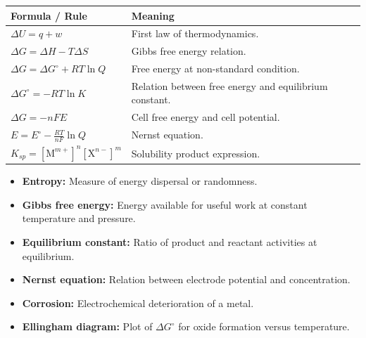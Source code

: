 \documentclass[12pt,a4paper]{article}
\begin{document}
\begin{tcolorbox}[formulabox, title={Key Formulas at a Glance}]
\begin{tabularx}{\linewidth}{|B{4.0cm}|Y|}
\hline
\textbf{Formula / Rule} & \textbf{Meaning} \\
\hline
$\Delta U=q+w$ & First law of thermodynamics. \\
\hline
$\Delta G=\Delta H-T\Delta S$ & Gibbs free energy relation. \\
\hline
$\Delta G=\Delta G^\circ+RT\ln Q$ & Free energy at non-standard condition. \\
\hline
$\Delta G^\circ=-RT\ln K$ & Relation between free energy and equilibrium constant. \\
\hline
$\Delta G=-nFE$ & Cell free energy and cell potential. \\
\hline
$E=E^\circ-\displaystyle\frac{RT}{nF}\ln Q$ & Nernst equation. \\
\hline
$K_{sp}=[\mathrm{M}^{m+}]^n[\mathrm{X}^{n-}]^m$ & Solubility product expression. \\
\hline
\end{tabularx}
\end{tcolorbox}

\begin{tcolorbox}[defbox, title={One-Line Definitions}]
\begin{itemize}[leftmargin=*, itemsep=2pt, topsep=2pt]
  \item \textbf{Entropy:} Measure of energy dispersal or randomness.
  \item \textbf{Gibbs free energy:} Energy available for useful work at constant temperature and pressure.
  \item \textbf{Equilibrium constant:} Ratio of product and reactant activities at equilibrium.
  \item \textbf{Nernst equation:} Relation between electrode potential and concentration.
  \item \textbf{Corrosion:} Electrochemical deterioration of a metal.
  \item \textbf{Ellingham diagram:} Plot of $\Delta G^\circ$ for oxide formation versus temperature.
\end{itemize}
\end{tcolorbox}
\end{document}

